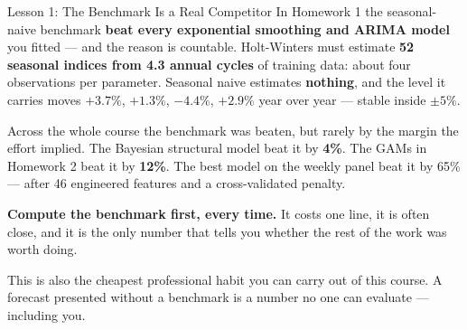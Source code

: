 \documentclass[aspectratio=169, 11pt]{beamer}
\begin{document}
\begin{frame}{Lesson 1: The Benchmark Is a Real Competitor}
  In Homework 1 the seasonal-naive benchmark \textbf{beat every exponential smoothing and ARIMA
  model} you fitted --- and the reason is countable. Holt-Winters must estimate \textbf{52
  seasonal indices from 4.3 annual cycles} of training data: about four observations per
  parameter. Seasonal naive estimates \textbf{nothing}, and the level it carries moves
  $+3.7\%$, $+1.3\%$, $-4.4\%$, $+2.9\%$ year over year --- stable inside $\pm 5\%$.

  \vspace{0.15cm}
  Across the whole course the benchmark was beaten, but rarely by the margin the effort implied.
  The Bayesian structural model beat it by \textbf{4\%}. The GAMs in Homework 2 beat it by
  \textbf{12\%}. The best model on the weekly panel beat it by 65\% --- after 46 engineered
  features and a cross-validated penalty.

  \begin{keybox}
    \textbf{Compute the benchmark first, every time.} It costs one line, it is often close, and
    it is the only number that tells you whether the rest of the work was worth doing.
  \end{keybox}

  \vspace{0.1cm}
  This is also the cheapest professional habit you can carry out of this course. A forecast
  presented without a benchmark is a number no one can evaluate --- including you.
\end{frame}
\end{document}
